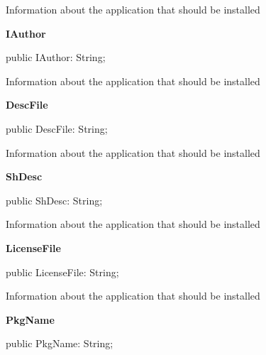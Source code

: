\documentclass{report}
\newif\ifpdf
\begin{document}
\begin{list}{}
\begin{flushleft}
\ifpdf
\end{flushleft}
\fi


\par Information about the application that should be installed\label{igobase.TIWizFrm-IAuthor}
\item[\textbf{IAuthor}\hfill]
\ifpdf
\begin{flushleft}
\fi
\begin{ttfamily}
public IAuthor: String;\end{ttfamily}

\ifpdf
\end{flushleft}
\fi


\par Information about the application that should be installed\label{igobase.TIWizFrm-DescFile}
\item[\textbf{DescFile}\hfill]
\ifpdf
\begin{flushleft}
\fi
\begin{ttfamily}
public DescFile: String;\end{ttfamily}

\ifpdf
\end{flushleft}
\fi


\par Information about the application that should be installed\label{igobase.TIWizFrm-ShDesc}
\item[\textbf{ShDesc}\hfill]
\ifpdf
\begin{flushleft}
\fi
\begin{ttfamily}
public ShDesc: String;\end{ttfamily}

\ifpdf
\end{flushleft}
\fi


\par Information about the application that should be installed\label{igobase.TIWizFrm-LicenseFile}
\item[\textbf{LicenseFile}\hfill]
\ifpdf
\begin{flushleft}
\fi
\begin{ttfamily}
public LicenseFile: String;\end{ttfamily}

\ifpdf
\end{flushleft}
\fi


\par Information about the application that should be installed\label{igobase.TIWizFrm-PkgName}
\item[\textbf{PkgName}\hfill]
\ifpdf
\begin{flushleft}
\fi
\begin{ttfamily}
public PkgName: String;\end{ttfamily}


\end{flushleft}
\end{list}
\end{document}

